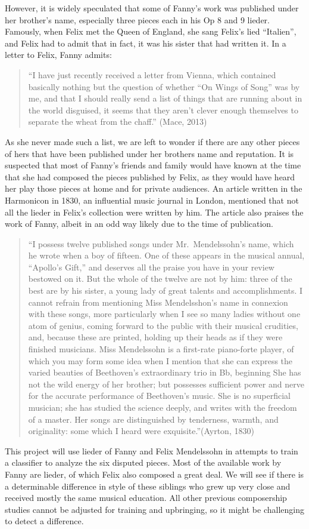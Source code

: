 \documentclass[12pt,twoside]{reedthesis}
\theoremstyle{definition}
\theoremstyle{definition}
\theoremstyle{definition}
\theoremstyle{remark}
\begin{document}
However, it is widely speculated that some of Fanny's work was published
under her brother's name, especially three pieces each in his Op 8 and 9
lieder. Famously, when Felix met the Queen of England, she sang Felix's
lied ``Italien'', and Felix had to admit that in fact, it was his sister
that had written it. In a letter to Felix, Fanny admits:
\begin{quote}
``I have just recently received a letter from Vienna, which contained
basically nothing but the question of whether ``On Wings of Song'' was
by me, and that I should really send a list of things that are running
about in the world disguised, it seems that they aren't clever enough
themselves to separate the wheat from the chaff.'' (Mace, 2013)
\end{quote}
As she never made such a list, we are left to wonder if there are any
other pieces of hers that have been published under her brothers name
and reputation. It is suspected that most of Fanny's friends and family
would have known at the time that she had composed the pieces published
by Felix, as they would have heard her play those pieces at home and for
private audiences. An article written in the Harmonicon in 1830, an
influential music journal in London, mentioned that not all the lieder
in Felix's collection were written by him. The article also praises the
work of Fanny, albeit in an odd way likely due to the time of
publication.
\begin{quote}
``I possess twelve published songs under Mr.~Mendelssohn's name, which
he wrote when a boy of fifteen. One of these appears in the musical
annual, ``Apollo's Gift,'' and deserves all the praise you have in your
review bestowed on it. But the whole of the twelve are not by him: three
of the best are by his sister, a young lady of great talents and
accomplishments. I cannot refrain from mentioning Miss Mendelsshon's
name in connexion with these songs, more particularly when I see so many
ladies without one atom of genius, coming forward to the public with
their musical crudities, and, because these are printed, holding up
their heads as if they were finished musicians. Miss Mendelssohn is a
first-rate piano-forte player, of which you may form some idea when I
mention that she can express the varied beauties of Beethoven's
extraordinary trio in Bb, beginning She has not the wild energy of her
brother; but possesses sufficient power and nerve for the accurate
performance of Beethoven's music. She is no superficial musician; she
has studied the science deeply, and writes with the freedom of a master.
Her songs are distinguished by tenderness, warmth, and originality: some
which I heard were exquisite.''(Ayrton, 1830)
\end{quote}
This project will use lieder of Fanny and Felix Mendelssohn in attempts
to train a classifier to analyze the six disputed pieces. Most of the
available work by Fanny are lieder, of which Felix also composed a great
deal. We will see if there is a determinable difference in style of
these siblings who grew up very close and received mostly the same
musical education. All other previous composership studies cannot be
adjusted for training and upbringing, so it might be challenging to
detect a difference.
\end{document}

